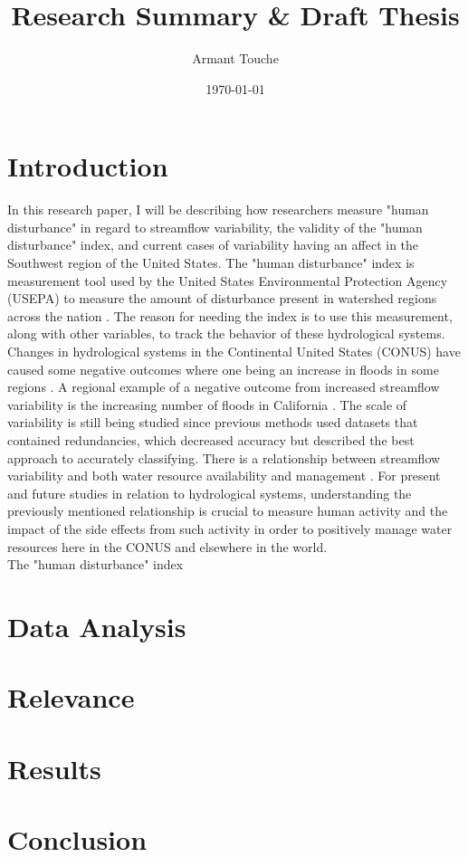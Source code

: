 \documentclass[a4paper,man,biblatex]{apa6}
\title{Research Summary \& Draft Thesis}
\author{Armant Touche}
\affiliation{Portland State University}
\date{\today}
\begin{document}
\thispagestyle{otherpage}
\setcounter{biburllcpenalty}{7000}
\setcounter{biburlucpenalty}{8000}


\section{Introduction} In this research paper, I will be describing how researchers measure "human disturbance" in regard to streamflow variability, the validity of the "human disturbance" index, and current cases of variability having an affect in the Southwest region of the United States. The "human disturbance" index is measurement tool used by the United States Environmental Protection Agency (USEPA) to measure the amount of disturbance present in watershed regions across the nation \autocite{falcone_2016}. The reason for needing the index is to use this measurement, along with other variables, to track the behavior of these hydrological systems. Changes in hydrological systems in the Continental United States (CONUS) have caused some negative outcomes where one being an increase in floods in some regions \autocite{rice_2016}. A regional example of a negative outcome from increased streamflow variability is the increasing number of floods in California \autocite{standford_2020}. The scale of variability is still being studied since previous methods used datasets that contained redundancies, which decreased accuracy but \textcite{falcone_2016} described the best approach to accurately classifying. There is a relationship between streamflow variability and both water resource availability and management \autocite{rice_2016}. For present and future studies in relation to hydrological systems, understanding the previously mentioned relationship is crucial to measure human activity and the impact of the side effects from such activity in order to positively manage water resources here in the CONUS and elsewhere in the world.\\
The "human disturbance" index

\section{Data Analysis} 

\section{Relevance} 

\section{Results} 

\section{Conclusion}  

\printbibliography
\end{document}
